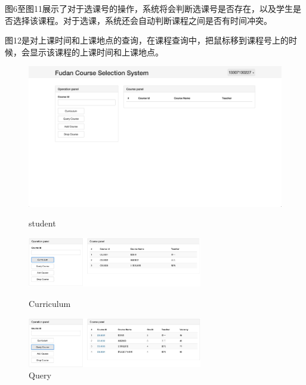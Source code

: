 \documentclass[a4paper, 11pt, nofonts, nocap, fancyhdr]{ctexart}
\begin{document}
	图6至图11展示了对于选课号的操作，系统将会判断选课号是否存在，以及学生是否选择该课程。对于选课，系统还会自动判断课程之间是否有时间冲突。

	图12是对上课时间和上课地点的查询，在课程查询中，把鼠标移到课程号上的时候，会显示该课程的上课时间和上课地点。

	
	\begin{figure}[ht]

		\centering
		\includegraphics[width=6in]{student}
		\caption{student}

		\vspace{0.8cm}

		\begin{minipage}{0.5\textwidth}
			\centering
			\includegraphics[width=3in]{curriculum}
			\caption{Curriculum}
		\end{minipage}%
		\begin{minipage}{0.5\textwidth}
			\centering
			\includegraphics[width=3in]{query}
			\caption{Query}
		\end{minipage}

		\vspace{0.8cm}


\end{figure}
\end{document}
